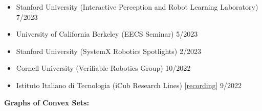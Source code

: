 \documentclass[11pt,a4paper,sans]{moderncv}
\begin{document}
\begin{itemize}

\item Stanford University (Interactive Perception and Robot Learning Laboratory) \hfill 7/2023
\item University of California Berkeley (EECS Seminar) \hfill 5/2023
\item Stanford University (SystemX Robotics Spotlights) \hfill 2/2023
\item Cornell University (Verifiable Robotics Group) \hfill 10/2022
\item  Istituto Italiano di Tecnologia (iCub Research Lines) [\href{https://www.youtube.com/watch?v=FoqAAgqgn-o}{\color{orange}recording}] \hfill 9/2022

\end{itemize}


\textbf{Graphs of Convex Sets:}
\end{document}
